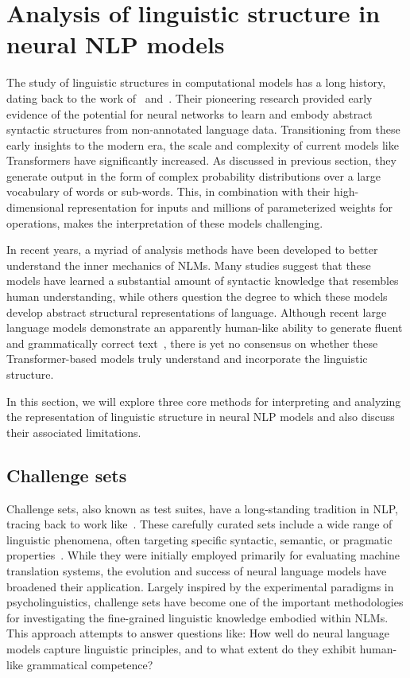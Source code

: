 \section{Analysis of linguistic structure in neural NLP models}\label{sec:review_structure_nlm}

The study of linguistic structures in computational models has a long history, dating back to the work of~\cite{elman1990finding,elman89representation} and~\cite{tabor1994syntactic}. Their pioneering research provided early evidence of the potential for neural networks to learn and embody abstract syntactic structures from non-annotated language data. Transitioning from these early insights to the modern era, the scale and complexity of current models like Transformers have significantly increased. As discussed in previous section, they generate output in the form of complex probability distributions over a large vocabulary of words or sub-words. This, in combination with their high-dimensional representation for inputs and millions of parameterized weights for operations, makes the interpretation of these models challenging.

In recent years, a myriad of analysis methods have been developed to better understand the inner mechanics of NLMs. Many studies suggest that these models have learned a substantial amount of syntactic knowledge that resembles human understanding, while others question the degree to which these models develop abstract structural representations of language. Although recent large language models demonstrate an apparently human-like ability to generate fluent and grammatically correct text~\citep{bubeck2023sparks}, there is yet no consensus on whether these Transformer-based models truly understand and incorporate the linguistic structure.

In this section, we will explore three core methods for interpreting and analyzing the representation of linguistic structure in neural NLP models and also discuss their associated limitations.

\subsection{Challenge sets} \label{sec:behav_test}
Challenge sets, also known as test suites, have a long-standing tradition in NLP, tracing back to work like~\cite{lehmann-etal-1996-tsnlp}. These carefully curated sets include a wide range of linguistic phenomena, often targeting specific syntactic, semantic, or pragmatic properties~. While they were initially employed primarily for evaluating machine translation systems, the evolution and success of neural language models have broadened their application. Largely inspired by the experimental paradigms in psycholinguistics, challenge sets have become one of the important methodologies for investigating the fine-grained linguistic knowledge embodied within NLMs. This approach attempts to answer questions like: How well do neural language models capture linguistic principles, and to what extent do they exhibit human-like grammatical competence?


